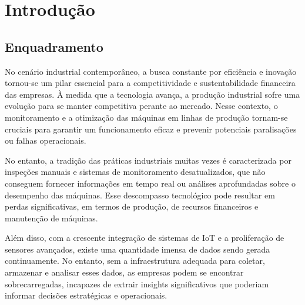 \chapter{Introdução}\label{cap:intro}


\section{Enquadramento}


No cenário industrial contemporâneo, a busca constante por eficiência e inovação tornou-se um pilar essencial para a competitividade e sustentabilidade financeira das empresas. À medida que a tecnologia avança, a produção industrial sofre uma evolução para se manter competitiva perante ao mercado. Nesse contexto, o monitoramento e a otimização das máquinas em linhas de produção tornam-se cruciais para garantir um funcionamento eficaz e prevenir potenciais paralisações ou falhas operacionais.

No entanto, a tradição das práticas industriais muitas vezes é caracterizada por inspeções manuais e sistemas de monitoramento desatualizados, que não conseguem fornecer informações em tempo real ou análises aprofundadas sobre o desempenho das máquinas. Esse descompasso tecnológico pode resultar em perdas significativas, em termos de produção, de recursos financeiros e manutenção de máquinas.

Além disso, com a crescente integração de sistemas de IoT e a proliferação de sensores avançados, existe uma quantidade imensa de dados sendo gerada continuamente. No entanto, sem a infraestrutura adequada para coletar, armazenar e analisar esses dados, as empresas podem se encontrar sobrecarregadas, incapazes de extrair insights significativos que poderiam informar decisões estratégicas e operacionais.

